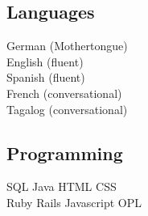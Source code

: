 \documentclass[letterpaper]{deedy-resume} %
\begin{document}
\begin{minipage}[t]{0.33\textwidth}
\subsection{Languages}

German (Mothertongue)\\
English (fluent)\\ 
Spanish (fluent)\\ 
French (conversational)\\ 
Tagalog (conversational)\\ 

\sectionspace %

\subsection{Programming}

SQL \textbullet{} Java \textbullet{} HTML \textbullet{} CSS\\
Ruby \textbullet{} Rails \textbullet{} Javascript \textbullet{} OPL \\

\sectionspace %


\end{minipage} %
\hfill
%
%
\end{document}
